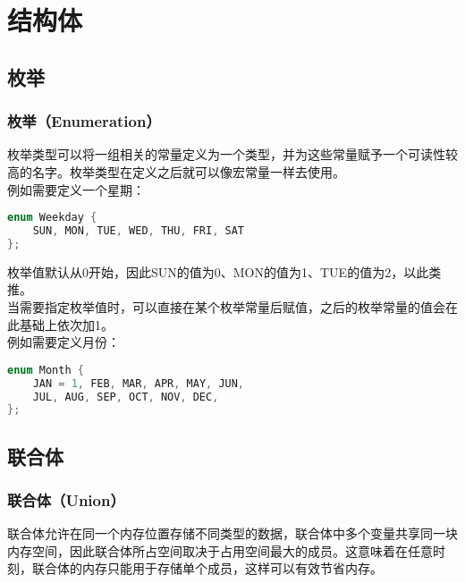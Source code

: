 \chapter{结构体}

\section{枚举}

\subsection{枚举（Enumeration）}

枚举类型可以将一组相关的常量定义为一个类型，并为这些常量赋予一个可读性较高的名字。枚举类型在定义之后就可以像宏常量一样去使用。\\

例如需要定义一个星期：

\vspace{-0.5cm}

\begin{lstlisting}[language=C]
enum Weekday {
    SUN, MON, TUE, WED, THU, FRI, SAT
};
\end{lstlisting}

枚举值默认从0开始，因此SUN的值为0、MON的值为1、TUE的值为2，以此类推。\\

当需要指定枚举值时，可以直接在某个枚举常量后赋值，之后的枚举常量的值会在此基础上依次加1。\\

例如需要定义月份：

\vspace{-0.5cm}

\begin{lstlisting}[language=C]
enum Month {
    JAN = 1, FEB, MAR, APR, MAY, JUN,
    JUL, AUG, SEP, OCT, NOV, DEC,
};
\end{lstlisting}

\newpage

\section{联合体}

\subsection{联合体（Union）}

联合体允许在同一个内存位置存储不同类型的数据，联合体中多个变量共享同一块内存空间，因此联合体所占空间取决于占用空间最大的成员。这意味着在任意时刻，联合体的内存只能用于存储单个成员，这样可以有效节省内存。\\

